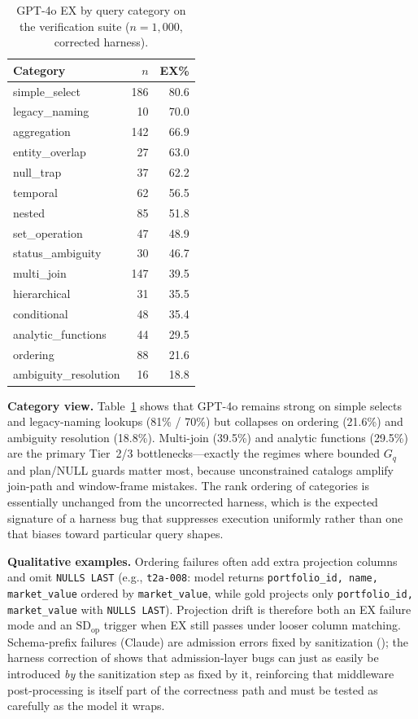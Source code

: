 \documentclass[twocolumn]{svjour3}
\begin{document}
\begin{table}[t]
\centering
\caption{GPT-4o EX by query category on the verification suite ($n{=}1{,}000$, corrected harness).}
\label{tab:category}
\small
\begin{tabular}{@{}lrr@{}}
\toprule
\textbf{Category} & \textbf{$n$} & \textbf{EX\%} \\
\midrule
simple\_select & 186 & 80.6 \\
legacy\_naming & 10 & 70.0 \\
aggregation & 142 & 66.9 \\
entity\_overlap & 27 & 63.0 \\
null\_trap & 37 & 62.2 \\
temporal & 62 & 56.5 \\
nested & 85 & 51.8 \\
set\_operation & 47 & 48.9 \\
status\_ambiguity & 30 & 46.7 \\
multi\_join & 147 & 39.5 \\
hierarchical & 31 & 35.5 \\
conditional & 48 & 35.4 \\
analytic\_functions & 44 & 29.5 \\
ordering & 88 & 21.6 \\
ambiguity\_resolution & 16 & 18.8 \\
\bottomrule
\end{tabular}
\end{table}

\textbf{Category view.}
Table~\ref{tab:category} shows that GPT-4o remains strong on simple selects and legacy-naming lookups (81\% / 70\%) but collapses on ordering (21.6\%) and ambiguity resolution (18.8\%).
Multi-join (39.5\%) and analytic functions (29.5\%) are the primary Tier~2/3 bottlenecks---exactly the regimes where bounded $G_q$ and plan/NULL guards matter most, because unconstrained catalogs amplify join-path and window-frame mistakes.
The rank ordering of categories is essentially unchanged from the uncorrected harness, which is the expected signature of a harness bug that suppresses execution uniformly rather than one that biases toward particular query shapes.

\textbf{Qualitative examples.}
Ordering failures often add extra projection columns and omit \texttt{NULLS LAST} (e.g., \texttt{t2a-008}: model returns \texttt{portfolio\_id, name, market\_value} ordered by \texttt{market\_value}, while gold projects only \texttt{portfolio\_id, market\_value} with \texttt{NULLS LAST}).
Projection drift is therefore both an EX failure mode and an $\text{SD}_{\text{op}}$ trigger when EX still passes under looser column matching.
Schema-prefix failures (Claude) are admission errors fixed by sanitization (); the harness correction of  shows that admission-layer bugs can just as easily be introduced \emph{by} the sanitization step as fixed by it, reinforcing that middleware post-processing is itself part of the correctness path and must be tested as carefully as the model it wraps.
\end{document}
